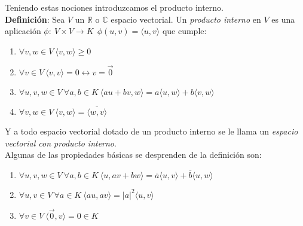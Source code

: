 \documentclass[a4paper,spanish]{article}
\def\C {\mathbb{C}}
\def\R {\mathbb{R}}
\numberwithin{equation}{section}
\begin{document}
Teniendo estas nociones introduzcamos el producto interno.\\
\newline
\textbf{Definici\'on}: Sea $V$ un $\R$ o $\C$ espacio vectorial. Un \textit{producto interno} en $V$ es una aplicaci\'on $\phi: \ V \times V \rightarrow K \ \ \phi\left({u,v}\right)=\langle{u,v}\rangle$ que cumple:\\
\begin{enumerate}
\item $\forall v,w \in V \ \langle{v,w}\rangle \geq 0$
\item $\forall v\in V \ \langle{v,v}\rangle=0 \longleftrightarrow v=\vec0 $
\item $\forall u,v,w \in V \ \forall a,b \in K \ \langle{au+bv,w}\rangle = a\langle{u,w}\rangle + b\langle{v,w}\rangle$
\item $\forall v,w \in V \ \langle{v,w}\rangle= \overline{\langle{w,v}\rangle}$
\end{enumerate} 

Y a todo espacio vectorial dotado de un producto interno se le llama un \textit{espacio vectorial con producto interno}.\\
Algunas de las propiedades b\'asicas se desprenden de la definici\'on son:

\begin{enumerate}
\item $\forall u,v,w \in V \ \forall a,b \in K \ \langle{u,av+bw}\rangle = \overline{a}\langle{u,v}\rangle + \overline{b}\langle{u,w}\rangle$
\item $\forall u,v \in V \ \forall a\in K \ \langle{au,av}\rangle = \vert{a}\vert ^2 \langle{u,v}\rangle$
\item $\forall v \in V \ \langle{\vec{0},v}\rangle=0 \in K$
\end{enumerate}
\end{document}
